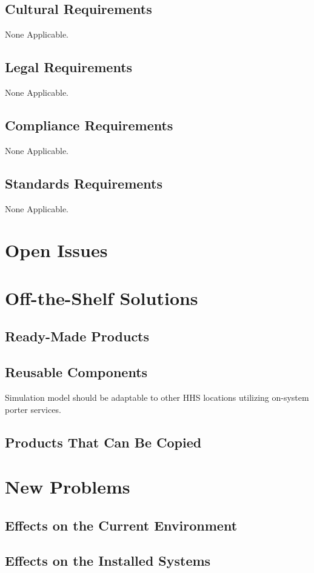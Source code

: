 \documentclass[paper=letter, fontsize=10pt]{scrartcl}
\numberwithin{equation}{section}		%
\numberwithin{figure}{section}			%
\numberwithin{table}{section}				%
\begin{document}
\subsection{Cultural Requirements}
None Applicable.
\subsection{Legal Requirements}
None Applicable.
\subsection{Compliance Requirements}
None Applicable.
\subsection{Standards Requirements}
None Applicable.

\section{Open Issues}

\section{Off-the-Shelf Solutions}
\subsection{Ready-Made Products}
\subsection{Reusable Components}
Simulation model should be adaptable to other HHS locations utilizing on-system porter services.
\subsection{Products That Can Be Copied}

\section{New Problems}
\subsection{Effects on the Current Environment}
\subsection{Effects on the Installed Systems}
\end{document}
